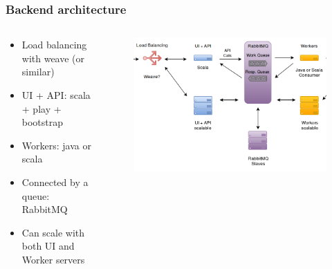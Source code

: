 \documentclass[11pt]{beamer}
\begin{document}
\begin{frame}
\frametitle{Backend architecture}
\begin{columns}
    \begin{column}{.5\textwidth}
        \begin{itemize}
            \item Load balancing with weave (or similar)
            \item UI + API: scala + play + bootstrap
            \item Workers: java or scala
            \item Connected by a queue: RabbitMQ
            \item Can scale with both UI and Worker servers
        \end{itemize}
    \end{column}
    \begin{column}{.5\textwidth}
        \begin{figure}
        \centering
        \includegraphics[width=\linewidth]{backend.png} 
        \end{figure}
    \end{column}
\end{columns}
\end{frame}
\end{document}
